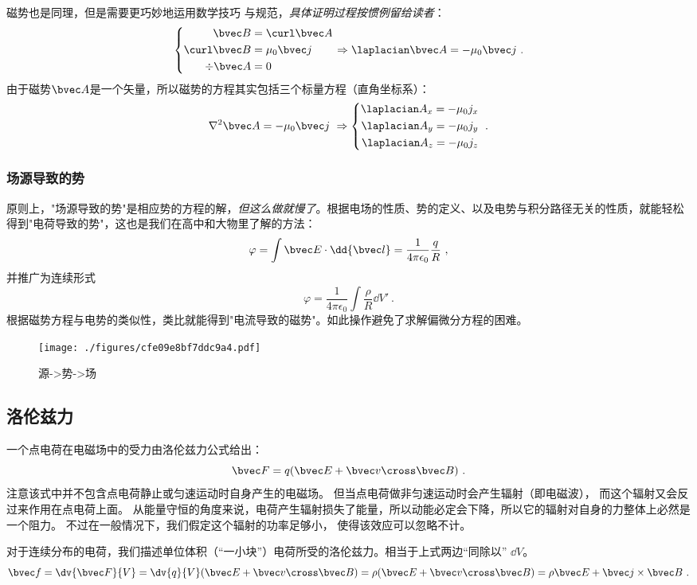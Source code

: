 磁势也是同理，但是需要更巧妙地运用数学技巧 与规范，\textsl{具体证明过程按惯例留给读者}：
$$
\left \{
\begin{aligned}
\bvec B &= \curl \bvec A\\
\curl \bvec B &= \mu_0 \bvec  j\\
\div \bvec A &= 0\\
\end{aligned}
\right.
\Rightarrow
\laplacian \bvec A = -\mu_0 \bvec j
~.
$$
由于磁势$\bvec A$是一个矢量，所以磁势的方程其实包括三个标量方程（直角坐标系）：
$$
\nabla^2 \bvec A = - \mu_0 \bvec j~
\Rightarrow
\left \{
\begin{aligned}
\laplacian A_x = -\mu_0 j_x\\
\laplacian A_y = -\mu_0 j_y\\
\laplacian A_z = -\mu_0 j_z\\
\end{aligned}
\right.
~.
$$

\subsubsection{场源导致的势}
原则上，"场源导致的势"是相应势的方程的解，\textsl{但这么做就慢了}。根据电场的性质、势的定义、以及电势与积分路径无关的性质，就能轻松得到"电荷导致的势"，这也是我们在高中和大物里了解的方法：
$$\varphi = \int \bvec E \cdot \dd {\bvec l} = \frac{1}{4\pi\epsilon_0} \frac{q}{R}~,$$
并推广为连续形式
$$\varphi = \frac{1}{4\pi\epsilon_0} \int \frac{\rho}{R} \dd V'~.$$
根据磁势方程与电势的类似性，类比就能得到"电流导致的磁势"。如此操作避免了求解偏微分方程的困难。

\begin{figure}[ht]
\centering
\texttt{[image: ./figures/cfe09e8bf7ddc9a4.pdf]}
\caption{源->势->场} \label{fig_estfid_2}
\end{figure}

\subsection{洛伦兹力}
一个点电荷在电磁场中的受力由洛伦兹力公式给出：
$$
\bvec F = q (\bvec E + \bvec v \cross \bvec B)~.
$$
注意该式中并不包含点电荷静止或匀速运动时自身产生的电磁场。 但当点电荷做非匀速运动时会产生辐射（即电磁波）， 而这个辐射又会反过来作用在点电荷上面。 从能量守恒的角度来说，电荷产生辐射损失了能量，所以动能必定会下降，所以它的辐射对自身的力整体上必然是一个阻力。 不过在一般情况下，我们假定这个辐射的功率足够小， 使得该效应可以忽略不计。

对于连续分布的电荷，我们描述单位体积（“一小块”）电荷所受的洛伦兹力。相当于上式两边“同除以” $\dd V$。
$$\bvec f = \dv{\bvec F}{V} = \dv{q}{V} (\bvec E + \bvec v \cross \bvec B) = \rho (\bvec E + \bvec v \cross \bvec B)=\rho \bvec E + \bvec j \times \bvec B ~.$$
